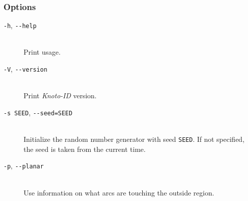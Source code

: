 \subsubsection{Options}
\begin{description}
\item[\lstinline{-h}, \lstinline{--help}]\hfill\\
  Print usage.
\item[\lstinline{-V}, \lstinline{--version}]\hfill\\
  Print {\it Knoto-ID} version.
\item[\lstinline{-s SEED}, \lstinline{--seed=SEED}]\hfill\\
  Initialize the random number generator with  seed \lstinline{SEED}. If not specified, the seed is taken from the current time. 
\item[\lstinline{-p}, \lstinline{--planar}]\hfill\\
  Use information on what arcs are touching the outside region.
  

\end{description}
